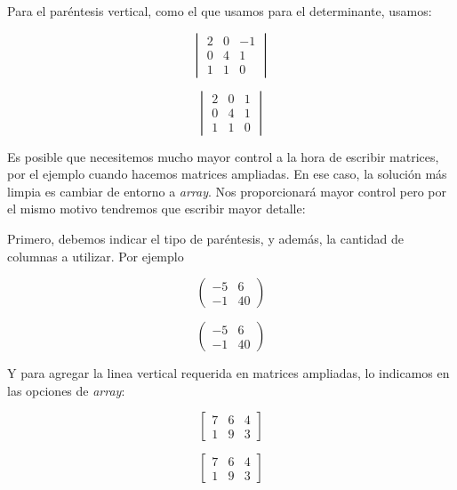 \documentclass[graybox,envcountchap,sectrefs]{svmono}
\begin{document}
Para el paréntesis vertical, como el que usamos para el determinante, usamos:
\begin{code}
    \[
        \begin{vmatrix}
            2   &   0   &   -1 \\
            0   &   4   &   1   \\
            1   &   1   &   0
        \end{vmatrix}
    \]
\end{code}
\begin{compiled}
    \[
        \begin{vmatrix}
            2   &   0   &   1 \\
            0   &   4   &   1   \\
            1   &   1   &   0
        \end{vmatrix}
    \]
\end{compiled}
Es posible que necesitemos mucho mayor control a la hora de escribir matrices, por el ejemplo cuando hacemos matrices ampliadas.
En ese caso, la solución más limpia es cambiar de entorno a \emph{array}. Nos proporcionará mayor control pero por el mismo motivo tendremos que escribir mayor detalle:


Primero, debemos indicar el tipo de paréntesis, y además, la cantidad de columnas a utilizar. Por ejemplo
\begin{code}
    \[
        \left(
            \begin{array}{cc}
                -5   &   6 \\
                -1  & 40
            \end{array}
        \right)
    \]
\end{code}

\begin{compiled}
    \[
        \left(
            \begin{array}{cc}
                -5   &   6 \\
                -1  & 40
            \end{array}
        \right)
    \]
\end{compiled}
Y para agregar la linea vertical requerida en matrices ampliadas, lo indicamos en las opciones de \emph{array}:
\begin{code}
    \[
        \left[
            \begin{array}{cc|c}
                7   &   6  &     4\\
                1  & 9      &   3
            \end{array}
        \right]
    \]
\end{code}
\begin{compiled}
    \[
        \left[
            \begin{array}{cc|c}
                7   &   6  &     4\\
                1  & 9      &   3
            \end{array}
        \right]
    \]
\end{compiled}
\end{document}
